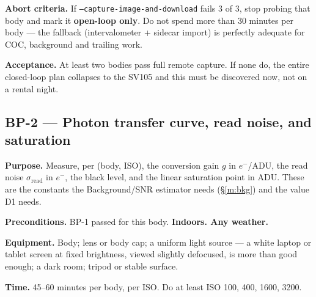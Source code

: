 \documentclass[11pt]{article}
\newcommand{\co}[1]{\texttt{\small #1}}
\begin{document}
\textbf{Abort criteria.} If \co{--capture-image-and-download} fails 3 of 3, stop
probing that body and mark it \textbf{open-loop only}. Do not spend more than
30 minutes per body --- the fallback (intervalometer + sidecar import) is
perfectly adequate for COC, background and trailing work.

\textbf{Acceptance.} At least two bodies pass full remote capture. If none do,
the entire closed-loop plan collapses to the SV105 and this must be discovered
now, not on a rental night.

\subsection*{BP-2 --- Photon transfer curve, read noise, and saturation}

\textbf{Purpose.} Measure, per (body, ISO), the conversion gain $g$ in
$e^-$/ADU, the read noise $\sigma_{\mathrm{read}}$ in $e^-$, the black level,
and the linear saturation point in ADU. These are the constants the
Background/SNR estimator needs (\S\ref{m:bkg}) and the value D1 needs.

\textbf{Preconditions.} BP-1 passed for this body. \textbf{Indoors. Any
weather.}

\textbf{Equipment.} Body; lens or body cap; a uniform light source --- a
white laptop or tablet screen at fixed brightness, viewed slightly defocused,
is more than good enough; a dark room; tripod or stable surface.

\textbf{Time.} 45--60 minutes per body, per ISO. Do at least ISO 100, 400, 1600,
3200.
\end{document}
